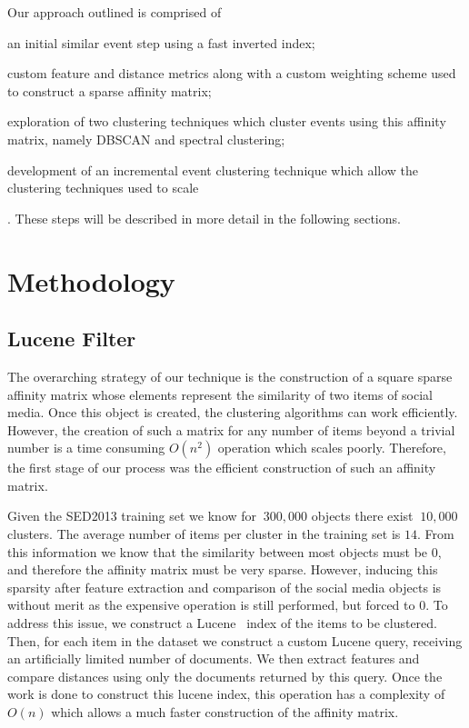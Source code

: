 \documentclass{../acm_proc_article-me11_tweaked}
\begin{document}
Our approach outlined is comprised of \begin{inparaenum}
\item an initial similar event step using a fast inverted index;
\item custom feature and distance metrics along with a custom weighting scheme used to construct a sparse affinity matrix;
\item exploration of two clustering techniques which cluster events using this affinity matrix, namely DBSCAN and spectral clustering;
\item development of an incremental event clustering technique which allow the clustering techniques used to scale
\end{inparaenum}. These steps will be described in more detail in the following sections.

\section{Methodology} %
\label{sec:methodology}

\subsection{Lucene Filter} %
\label{sub:lucene_filter}
The overarching strategy of our technique is the construction of a square sparse affinity matrix whose elements represent the similarity of two items of social media. Once this object is created, the clustering algorithms can work efficiently. However, the creation of such a matrix for any number of items beyond a trivial number is a time consuming $O(n^2)$ operation which scales poorly. Therefore, the first stage of our process was the efficient construction of such an affinity matrix. 

Given the SED2013 training set we know for $~300,000$ objects there exist $~10,000$ clusters. The average number of items per cluster in the training set is $14$. From this information we know that the similarity between most objects must be 0, and therefore the affinity matrix must be very sparse. However, inducing this sparsity after feature extraction and comparison of the social media objects is without merit as the expensive operation is still performed, but forced to 0. To address this issue, we construct a Lucene~\cite{????} index of the items to be clustered. Then, for each item in the dataset we construct a custom Lucene query, receiving an artificially limited number of documents. We then extract features and compare distances using only the documents returned by this query. Once the work is done to construct this lucene index, this operation has a complexity of $O(n)$ which allows a much faster construction of the affinity matrix.
\end{document}
